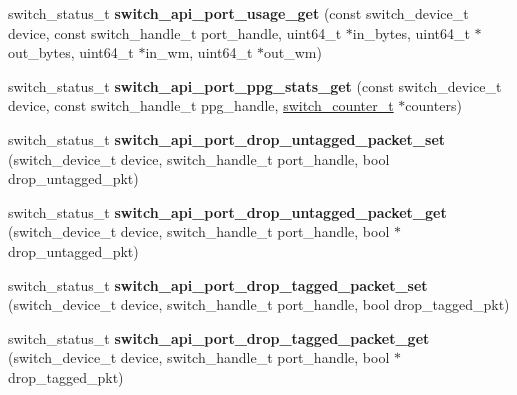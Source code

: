 \begin{DoxyCompactItemize}
\item 
\hypertarget{group__Port_gad482dcd4ace702e932ad018a5d0ee185}{switch\+\_\+status\+\_\+t {\bfseries switch\+\_\+api\+\_\+port\+\_\+usage\+\_\+get} (const switch\+\_\+device\+\_\+t device, const switch\+\_\+handle\+\_\+t port\+\_\+handle, uint64\+\_\+t $\ast$in\+\_\+bytes, uint64\+\_\+t $\ast$out\+\_\+bytes, uint64\+\_\+t $\ast$in\+\_\+wm, uint64\+\_\+t $\ast$out\+\_\+wm)}\label{group__Port_gad482dcd4ace702e932ad018a5d0ee185}

\item 
\hypertarget{group__Port_ga66506a5972373a3a8cd0dd4d626300a1}{switch\+\_\+status\+\_\+t {\bfseries switch\+\_\+api\+\_\+port\+\_\+ppg\+\_\+stats\+\_\+get} (const switch\+\_\+device\+\_\+t device, const switch\+\_\+handle\+\_\+t ppg\+\_\+handle, \hyperlink{structswitch__counter__s}{switch\+\_\+counter\+\_\+t} $\ast$counters)}\label{group__Port_ga66506a5972373a3a8cd0dd4d626300a1}

\item 
\hypertarget{group__Port_gac1f639a5a54dea864d2120a6f6ffd5da}{switch\+\_\+status\+\_\+t {\bfseries switch\+\_\+api\+\_\+port\+\_\+drop\+\_\+untagged\+\_\+packet\+\_\+set} (switch\+\_\+device\+\_\+t device, switch\+\_\+handle\+\_\+t port\+\_\+handle, bool drop\+\_\+untagged\+\_\+pkt)}\label{group__Port_gac1f639a5a54dea864d2120a6f6ffd5da}

\item 
\hypertarget{group__Port_ga3c59ae9666c21ebcf120f36f708c730f}{switch\+\_\+status\+\_\+t {\bfseries switch\+\_\+api\+\_\+port\+\_\+drop\+\_\+untagged\+\_\+packet\+\_\+get} (switch\+\_\+device\+\_\+t device, switch\+\_\+handle\+\_\+t port\+\_\+handle, bool $\ast$drop\+\_\+untagged\+\_\+pkt)}\label{group__Port_ga3c59ae9666c21ebcf120f36f708c730f}

\item 
\hypertarget{group__Port_gaf7cea664eceb2c128b4c2e1ca0442ce6}{switch\+\_\+status\+\_\+t {\bfseries switch\+\_\+api\+\_\+port\+\_\+drop\+\_\+tagged\+\_\+packet\+\_\+set} (switch\+\_\+device\+\_\+t device, switch\+\_\+handle\+\_\+t port\+\_\+handle, bool drop\+\_\+tagged\+\_\+pkt)}\label{group__Port_gaf7cea664eceb2c128b4c2e1ca0442ce6}

\item 
\hypertarget{group__Port_gac45b260f2c0d5d49a8b75a1348595646}{switch\+\_\+status\+\_\+t {\bfseries switch\+\_\+api\+\_\+port\+\_\+drop\+\_\+tagged\+\_\+packet\+\_\+get} (switch\+\_\+device\+\_\+t device, switch\+\_\+handle\+\_\+t port\+\_\+handle, bool $\ast$drop\+\_\+tagged\+\_\+pkt)}\label{group__Port_gac45b260f2c0d5d49a8b75a1348595646}


\end{DoxyCompactItemize}
